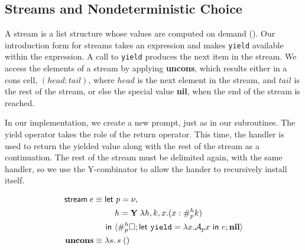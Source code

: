 \documentclass[11pt]{article}
\newcommand{\maybePage}{\newpage}
\newcommand\x{\lambda x}
\newcommand{\letin}[2]{\textsf{let }#1\textsf{ in }#2}
\newcommand\A{\mathcal{A}}
\newcommand{\angles}[1]{\langle#1\rangle}
\begin{document}
%
%

\maybePage
\subsection{Streams and Nondeterministic Choice}

A stream is a list structure whose values are computed on demand (\cite{SICP}).
Our introduction form for streams takes an expression and makes \texttt{yield} available within the expression.
A call to \texttt{yield} produces the next item in the stream.
We access the elements of a stream by applying \textbf{uncons}, which results either in a cons cell, $(head:tail)$, where $head$ is the next element in the stream, and $tail$ is the rest of the stream, or else the special value \textbf{nil}, when the end of the stream is reached.

In our implementation, we create a new prompt, just as in our subroutines.
The yield operator takes the role of the return operator.
This time, the handler is used to return the yielded value along with the rest of the stream as a continuation.
The rest of the stream must be delimited again, with the same handler, so we use the Y-combinator to allow the hander to recursively install itself.

\begin{align*}
\textsf{stream}\;e &\equiv{}
\textsf{let }p = \nu, \\
  &\qquad\;\; h = \textbf Y\;\lambda h,k,x.(x:\#_p^hk) \\
  &\quad\;\,\textsf{in }
  \angles{\#_p^{h}\square; \letin{\texttt{yield}=\x.{\A_px}}{e}; \textbf{nil}} \\
\textbf{uncons} &\equiv \lambda s.\,s\;() \\
\end{align*}
\end{document}
